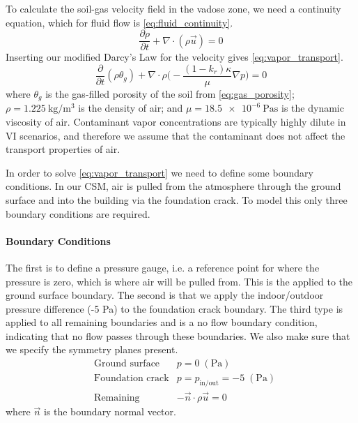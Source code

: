 To calculate the soil-gas velocity field in the vadose zone, we need a continuity equation, which for fluid flow is \eqref{eq:fluid_continuity}.
\begin{equation}\label{eq:fluid_continuity}
  \frac{\partial \rho}{\partial t} + \nabla \cdot (\rho \vec{u}) = 0
\end{equation}
Inserting our modified Darcy's Law for the velocity gives \eqref{eq:vapor_transport}.
\begin{equation}\label{eq:vapor_transport}
  \frac{\partial}{\partial t} (\rho \theta_g) + \nabla \cdot \rho \Big( -\frac{(1-k_r) \kappa}{\mu} \nabla p \Big) = 0
\end{equation}
where $\theta_g$ is the gas-filled porosity of the soil from \eqref{eq:gas_porosity};
$\rho = \SI{1.225}{\kilogram\per\metre\cubed}$ is the density of air;
and $\mu = \SI{18.5e-6}{\pascal\second}$ is the dynamic viscosity of air.
Contaminant vapor concentrations are typically highly dilute in VI scenarios, and therefore we assume that the contaminant does not affect the transport properties of air.\par

In order to solve \eqref{eq:vapor_transport} we need to define some boundary conditions.
In our CSM, air is pulled from the atmosphere through the ground surface and into the building via the foundation crack.
To model this only three boundary conditions are required.\par

\paragraph{Boundary Conditions}

The first is to define a pressure gauge, i.e. a reference point for where the pressure is zero, which is where air will be pulled from.
This is the applied to the ground surface boundary.
The second is that we apply the indoor/outdoor pressure difference (-5 Pa) to the foundation crack boundary.
The third type is applied to all remaining boundaries and is a no flow boundary condition, indicating that no flow passes through these boundaries.
We also make sure that we specify the symmetry planes present.
\begin{align}
  &\text{Ground surface} &p = 0 \; \mathrm{(Pa)} \\
  &\text{Foundation crack} &p = p_\mathrm{in/out} = -5 \; \mathrm{(Pa)} \\
  &\text{Remaining} &-\vec{n}\cdot\rho\vec{u} = 0
\end{align}
where $\vec{n}$ is the boundary normal vector.\par

